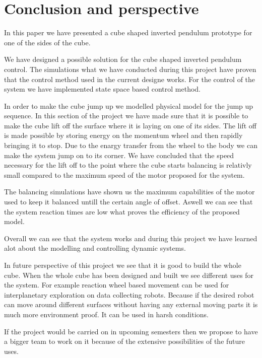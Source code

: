 \section{Conclusion and perspective}

In this paper we have presented a cube shaped inverted pendulum prototype for one of the sides of the cube.

We have designed a possible solution for the cube shaped inverted pendulum control.
The simulations what we have conducted during this project have proven that the control method used in the current designe works.
For the control of the system we have implemented state space based control method.

In order to make the cube jump up we modelled physical model for the jump up sequence.
In this section of the project we have made sure that it is possible to make the cube lift off the surface where it is laying on one of its sides.
The lift off is made possible by storing energy on the momentum wheel and then rapidly bringing it to stop.
Due to the enargy transfer from the wheel to the body we can make the system jump on to its corner.
We have concluded that the speed necessary for the lift off to the point where the cube starts balancing is relativly small compared to the maximum speed of the motor proposed for the system.

The balancing simulations have shown us the maximum capabilities of the motor used to keep it balanced untill the certain angle of offset.
Aswell we can see that the system reaction times are low what proves the efficiency of the proposed model.

Overall we can see that the system works and during this project we have learned alot about the modelling and controlling dynamic systems.

In future perspective of this project we see that it is good to build the whole cube.
When the whole cube has been designed and built we see different uses for the system.
For example reaction wheel based movement can be used for interplanetary exploration on data collecting robots.
Because if the desired robot can move around different surfaces without having any external moving parts it is much more environment proof.
It can be used in harsh conditions.

If the project would be carried on in upcoming semesters then we propose to have a bigger team to work on it because of the extensive possibilities of the future uses.
